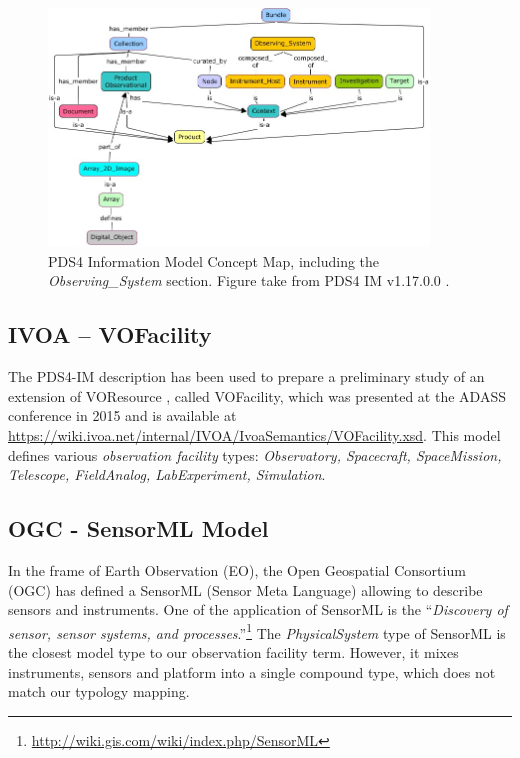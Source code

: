 \documentclass[11pt,a4paper]{ivoa}
\begin{document}
\begin{figure}
\centering\includegraphics[width=0.9\textwidth]{pds4-concept-map.jpg}
\caption{PDS4 Information Model Concept Map, including the 
\emph{Observing\_System} section. Figure take from PDS4 IM v1.17.0.0 
\protect\citep{pds4-im-v1H00}.}\label{fig:pds4-concept-map}
\end{figure}

\subsection{IVOA -- VOFacility}

The PDS4-IM description has been used to prepare a preliminary study of
an extension of VOResource \citep{2018ivoa.spec.0625P}, called VOFacility, 
which was presented at the ADASS conference in 2015 \citep{Louys:2015to} 
and is available at \url{https://wiki.ivoa.net/internal/IVOA/IvoaSemantics/VOFacility.xsd}. 
This model defines various \emph{observation facility} types: 
\emph{Observatory, Spacecraft, SpaceMission, Telescope, FieldAnalog,
LabExperiment, Simulation}. 


\subsection{OGC - SensorML Model}
In the frame of Earth Observation (EO), the Open Geospatial Consortium
(OGC) has defined a SensorML (Sensor Meta Language) \citep{ogc-sensorml} 
allowing to describe sensors and instruments. One of the application of 
SensorML is the ``\emph{Discovery of sensor, sensor systems, and
processes}.''\footnote{\url{http://wiki.gis.com/wiki/index.php/SensorML}} 
The \emph{PhysicalSystem} type of SensorML is the closest model type to
our observation facility term.  However, it mixes instruments, sensors 
and platform into a single compound type, which does not match our 
typology mapping. 
\end{document}
